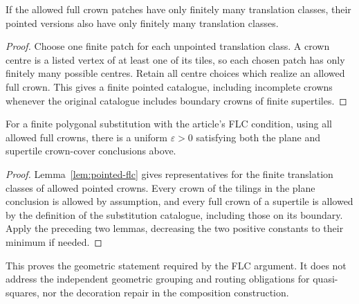 \begin{lemma}
\label{lem:pointed-flc}
If the allowed full crown patches have only finitely many translation
classes, their pointed versions also have only finitely many translation
classes.
\end{lemma}
\begin{proof}
Choose one finite patch for each unpointed translation class.  A crown
centre is a listed vertex of at least one of its tiles, so each chosen
patch has only finitely many possible centres.  Retain all centre choices
which realize an allowed full crown.  This gives a finite pointed
catalogue, including incomplete crowns whenever the original catalogue
includes boundary crowns of finite supertiles.
\end{proof}

\begin{theorem}
\label{thm:corrected-crown-cover}
For a finite polygonal substitution with the article's FLC condition,
using all allowed full crowns, there is a uniform $\varepsilon>0$ satisfying both
the plane and supertile crown-cover conclusions above.
\end{theorem}
\begin{proof}
Lemma~\ref{lem:pointed-flc} gives representatives for the finite translation
classes of allowed pointed crowns.  Every crown of the tilings in the plane conclusion is
allowed by assumption, and every full crown of a supertile is allowed
by the definition of the substitution catalogue, including those on its
boundary.  Apply the preceding two lemmas, decreasing the two positive
constants to their minimum if needed.
\end{proof}

This proves the geometric statement required by the FLC argument.  It
does not address the independent geometric grouping and routing
obligations for quasi-squares, nor the decoration repair in the
composition construction.
